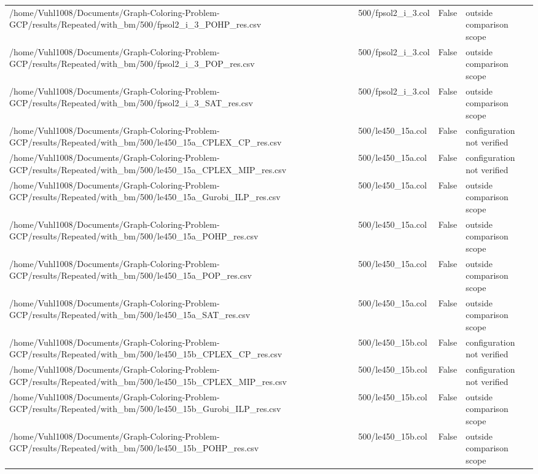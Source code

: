 \begin{table}[htbp]
\begin{tabular}{llll}
/home/Vuhl1008/Documents/Graph-Coloring-Problem-GCP/results/Repeated/with\_bm/500/fpsol2\_i\_3\_POHP\_res.csv & 500/fpsol2\_i\_3.col & False & outside comparison scope \\
/home/Vuhl1008/Documents/Graph-Coloring-Problem-GCP/results/Repeated/with\_bm/500/fpsol2\_i\_3\_POP\_res.csv & 500/fpsol2\_i\_3.col & False & outside comparison scope \\
/home/Vuhl1008/Documents/Graph-Coloring-Problem-GCP/results/Repeated/with\_bm/500/fpsol2\_i\_3\_SAT\_res.csv & 500/fpsol2\_i\_3.col & False & outside comparison scope \\
/home/Vuhl1008/Documents/Graph-Coloring-Problem-GCP/results/Repeated/with\_bm/500/le450\_15a\_CPLEX\_CP\_res.csv & 500/le450\_15a.col & False & configuration not verified \\
/home/Vuhl1008/Documents/Graph-Coloring-Problem-GCP/results/Repeated/with\_bm/500/le450\_15a\_CPLEX\_MIP\_res.csv & 500/le450\_15a.col & False & configuration not verified \\
/home/Vuhl1008/Documents/Graph-Coloring-Problem-GCP/results/Repeated/with\_bm/500/le450\_15a\_Gurobi\_ILP\_res.csv & 500/le450\_15a.col & False & outside comparison scope \\
/home/Vuhl1008/Documents/Graph-Coloring-Problem-GCP/results/Repeated/with\_bm/500/le450\_15a\_POHP\_res.csv & 500/le450\_15a.col & False & outside comparison scope \\
/home/Vuhl1008/Documents/Graph-Coloring-Problem-GCP/results/Repeated/with\_bm/500/le450\_15a\_POP\_res.csv & 500/le450\_15a.col & False & outside comparison scope \\
/home/Vuhl1008/Documents/Graph-Coloring-Problem-GCP/results/Repeated/with\_bm/500/le450\_15a\_SAT\_res.csv & 500/le450\_15a.col & False & outside comparison scope \\
/home/Vuhl1008/Documents/Graph-Coloring-Problem-GCP/results/Repeated/with\_bm/500/le450\_15b\_CPLEX\_CP\_res.csv & 500/le450\_15b.col & False & configuration not verified \\
/home/Vuhl1008/Documents/Graph-Coloring-Problem-GCP/results/Repeated/with\_bm/500/le450\_15b\_CPLEX\_MIP\_res.csv & 500/le450\_15b.col & False & configuration not verified \\
/home/Vuhl1008/Documents/Graph-Coloring-Problem-GCP/results/Repeated/with\_bm/500/le450\_15b\_Gurobi\_ILP\_res.csv & 500/le450\_15b.col & False & outside comparison scope \\
/home/Vuhl1008/Documents/Graph-Coloring-Problem-GCP/results/Repeated/with\_bm/500/le450\_15b\_POHP\_res.csv & 500/le450\_15b.col & False & outside comparison scope \\

\end{tabular}
\end{table}

